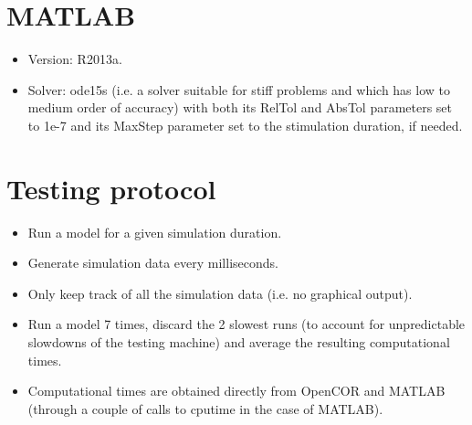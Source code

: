 \documentclass[a4paper,10pt,english]{sphinxmanual}
\begin{document}
\section{MATLAB}
\label{speed_comp:id3}\begin{itemize}
\item {} 
Version: R2013a.

\item {} 
Solver: ode15s (i.e. a solver suitable for stiff problems and which
has low to medium order of accuracy) with both its RelTol and
AbsTol parameters set to 1e-7 and its MaxStep parameter set to
the stimulation duration, if needed.

\end{itemize}


\section{Testing protocol}
\label{speed_comp:testing-protocol}\begin{itemize}
\item {} 
Run a model for a given simulation duration.

\item {} 
Generate simulation data every milliseconds.

\item {} 
Only keep track of all the simulation data (i.e. no graphical
output).

\item {} 
Run a model 7 times, discard the 2 slowest runs (to account for
unpredictable slowdowns of the testing machine) and average the
resulting computational times.

\item {} 
Computational times are obtained directly from OpenCOR and MATLAB
(through a couple of calls to cputime in the case of MATLAB).

\end{itemize}
\end{document}
